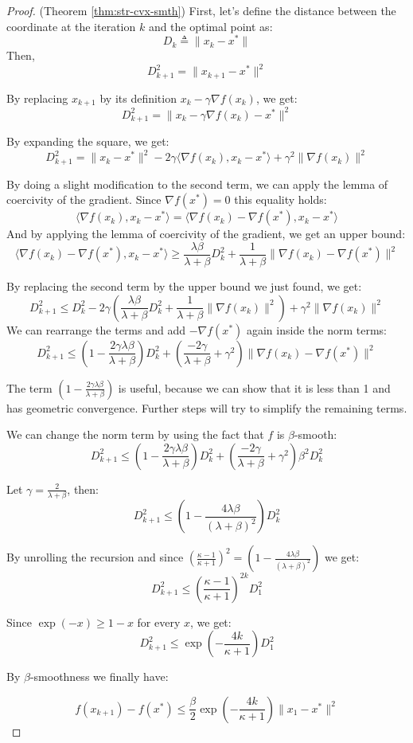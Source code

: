 \documentclass{article}
\begin{document}
\begin{proof} (Theorem \ref{thm:str-cvx-smth}) First, let's define the distance between the coordinate at the iteration $k$ and the optimal point as:
$$ D_k \triangleq \| x_k - x^{*}\|$$
Then,
$$ D_{k+1}^2 = \| x_{k+1} - x^{*} \|^{2} $$

By replacing $x_{k+1}$ by its definition $x_k - \gamma \nabla f(x_k)$, we get:
$$ D_{k+1}^2 = \| x_k - \gamma \nabla f(x_k) - x^{*} \|^{2} $$

By expanding the square, we get:
$$ D_{k+1}^2 = \| x_k - x^{*} \|^2 - 2 \gamma \langle \nabla f(x_k), x_k - x^{*} \rangle + \gamma^2 \| \nabla f(x_k) \|^2 $$

By doing a slight modification to the second term, we can apply the lemma of coercivity of the gradient. Since $ \nabla f(x^{*}) = 0$ this equality holds:
$$ \langle \nabla f(x_k), x_k - x^{*} \rangle = \langle \nabla f(x_k) - \nabla f(x^{*}), x_k - x^{*} \rangle $$
And by applying the lemma of coercivity of the gradient, we get an upper bound:
$$ \langle \nabla f(x_k) - \nabla f(x^{*}), x_k - x^{*} \rangle \geq \frac{\lambda \beta}{\lambda + \beta} D^2_k + \frac{1}{\lambda + \beta} \| \nabla f(x_k) - \nabla f(x^{*}) \|^2 $$

By replacing the second term by the upper bound we just found, we get:
$$ D^2_{k+1} \leq D^2_k - 2 \gamma \left(\frac{\lambda \beta}{\lambda + \beta} D^2_k + \frac{1}{\lambda + \beta} \| \nabla f(x_k)\|^2\right) + \gamma^2 \| \nabla f(x_k) \|^2$$
We can rearrange the terms and add $ - \nabla f(x^{*})$ again inside the norm terms:
$$ D_{k+1}^2 \leq \left(1 - \frac{2\gamma \lambda \beta}{\lambda + \beta}\right) D^2_k + \left( \frac{-2\gamma}{\lambda + \beta} + \gamma^2 \right) \| \nabla f(x_k) - \nabla f(x^{*}) \|^2$$

The term $\left(1-\frac{2\gamma \lambda \beta}{\lambda + \beta}\right)$ is useful, because we can show that it is less than 1 and has geometric convergence. Further steps will try to simplify the remaining terms.

We can change the norm term by using the fact that $f$ is $\beta$-smooth:
$$ D_{k+1}^2 \leq \left( 1 - \frac{2\gamma \lambda \beta}{\lambda + \beta}\right)  D^2_k + \left( \frac{-2\gamma}{\lambda + \beta} + \gamma^2 \right) \beta^2 D^2_k $$

Let $ \gamma = \frac{2}{\lambda + \beta} $, then:
$$ D^2_{k+1} \leq \left( 1 - \frac{4 \lambda \beta}{(\lambda + \beta)^2} \right) D^2_k $$

By unrolling the recursion and since $ \left( \frac{\kappa - 1}{\kappa + 1} \right)^2 = \left( 1 - \frac{4 \lambda \beta}{(\lambda + \beta)^2} \right) $ we get:
$$ D^2_{k+1} \leq \left( \frac{\kappa - 1}{\kappa + 1} \right)^{2k} D_1^2 $$

Since $\exp(-x) \geq 1-x$ for every $x$, we get:
$$ D_{k+1}^2 \leq \exp{\left( -\frac{4k}{\kappa + 1} \right)} D_1^2  $$

By $ \beta $-smoothness we finally have:

$$ f(x_{k+1}) - f(x^{*}) \leq \frac{\beta}{2} \exp{\left( -\frac{4k}{\kappa + 1} \right)} \| x_1 - x^{*} \|^2 $$

\end{proof}
\end{document}
